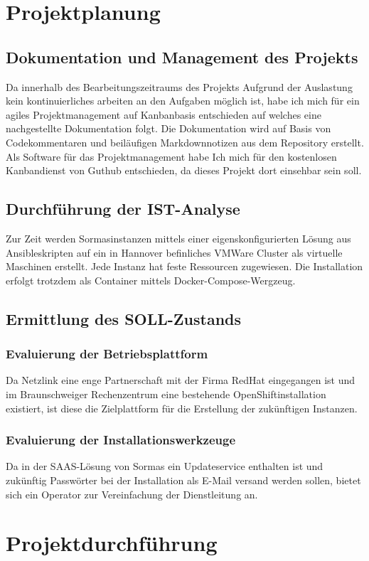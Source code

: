 \documentclass[a4paper,11pt]{article}
\begin{document}
  \section{Projektplanung}
    \subsection{Dokumentation und Management des Projekts}
    Da innerhalb des Bearbeitungszeitraums des Projekts Aufgrund der Auslastung kein 
    kontinuierliches arbeiten an den Aufgaben möglich ist, habe ich mich für ein agiles Projektmanagement
    auf Kanbanbasis entschieden auf welches eine nachgestellte Dokumentation folgt. Die Dokumentation wird auf
    Basis von Codekommentaren und beiläufigen Markdownnotizen aus dem Repository erstellt.
    Als Software für das Projektmanagement habe Ich mich für den kostenlosen Kanbandienst von Guthub entschieden, da dieses 
    Projekt dort einsehbar sein soll.
    \subsection{Durchführung der IST-Analyse}
    Zur Zeit werden Sormasinstanzen mittels einer eigenskonfigurierten Lösung aus Ansibleskripten auf ein 
    in Hannover befinliches VMWare Cluster als virtuelle Maschinen erstellt. Jede Instanz hat feste Ressourcen zugewiesen.
    Die Installation erfolgt trotzdem als Container mittels Docker-Compose-Wergzeug.
    \subsection{Ermittlung des SOLL-Zustands}
      \subsubsection{Evaluierung der Betriebsplattform}
      Da Netzlink eine enge Partnerschaft mit der Firma RedHat eingegangen ist und im Braunschweiger Rechenzentrum eine bestehende
      OpenShiftinstallation existiert, ist diese die Zielplattform für die Erstellung der zukünftigen Instanzen.
      \subsubsection{Evaluierung der Installationswerkzeuge}
      Da in der SAAS-Lösung von Sormas ein Updateservice enthalten ist und zukünftig Passwörter bei der Installation als E-Mail versand
      werden sollen, bietet sich ein Operator zur Vereinfachung der Dienstleitung an.
  \section{Projektdurchführung}
\end{document}
